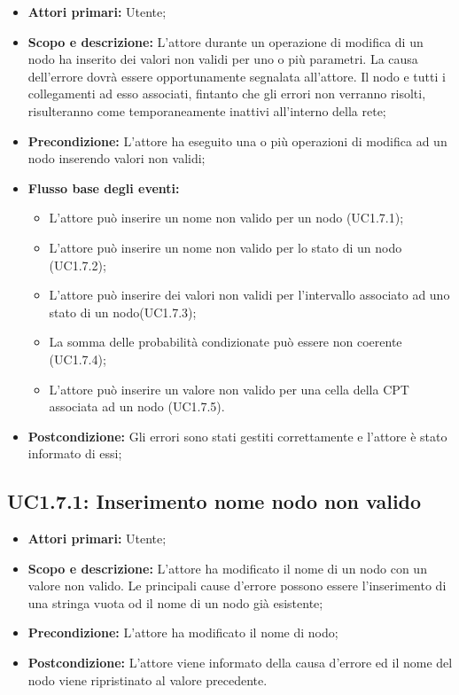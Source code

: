 \begin{itemize} 
	\item{\textbf{Attori primari:} Utente;} 
	\item{\textbf{Scopo e descrizione:} L'attore durante un operazione di modifica di un nodo ha inserito dei valori non validi per uno o più parametri. La causa dell'errore dovrà essere opportunamente segnalata all'attore. Il nodo e tutti i collegamenti ad esso associati, fintanto che gli errori non verranno risolti, risulteranno come temporaneamente inattivi all'interno della rete;} 
	\item{\textbf{Precondizione:} L'attore ha eseguito una o più operazioni di modifica ad un nodo inserendo valori non validi;} 
	\item{\textbf{Flusso base degli eventi:} } 
	\begin{itemize} 
	\item{L'attore può inserire un nome non valido per un nodo (UC1.7.1);} 
	\item{L'attore può inserire un nome non valido per lo stato di un nodo (UC1.7.2);} 
	\item{L'attore può inserire dei valori non validi per l'intervallo associato ad uno stato di un nodo(UC1.7.3);} 
	\item{La somma delle probabilità condizionate può essere non coerente (UC1.7.4);} 
	\item{L'attore può inserire un valore non valido per una cella della CPT associata ad un nodo (UC1.7.5).} 
	\end{itemize} 
	\item{\textbf{Postcondizione:} Gli errori sono stati gestiti correttamente e l'attore è stato informato di essi;} 
\end{itemize} 
\subsection{UC1.7.1: Inserimento nome nodo non valido} 
\begin{itemize} 
	\item{\textbf{Attori primari:} Utente;} 
	\item{\textbf{Scopo e descrizione:} L'attore ha modificato il nome di un nodo con un valore non valido. Le principali cause d'errore possono essere l'inserimento di una stringa vuota od il nome di un nodo già esistente;} 
	\item{\textbf{Precondizione:} L'attore ha modificato il nome di nodo;} 
	\item{\textbf{Postcondizione:} L'attore viene informato della causa d'errore ed il nome del nodo viene ripristinato al valore precedente.} 
\end{itemize} 
